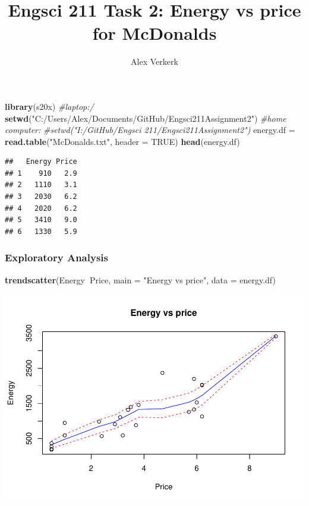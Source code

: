 \documentclass[]{article}
\title{Engsci 211 Task 2: Energy vs price for McDonalds}
\author{Alex Verkerk}
\date{}
\newenvironment{Shaded}{\begin{snugshade}}{\end{snugshade}}
\newcommand{\CommentTok}[1]{\textcolor[rgb]{0.56,0.35,0.01}{\textit{#1}}}
\newcommand{\DataTypeTok}[1]{\textcolor[rgb]{0.13,0.29,0.53}{#1}}
\newcommand{\KeywordTok}[1]{\textcolor[rgb]{0.13,0.29,0.53}{\textbf{#1}}}
\newcommand{\NormalTok}[1]{#1}
\newcommand{\OperatorTok}[1]{\textcolor[rgb]{0.81,0.36,0.00}{\textbf{#1}}}
\newcommand{\OtherTok}[1]{\textcolor[rgb]{0.56,0.35,0.01}{#1}}
\newcommand{\StringTok}[1]{\textcolor[rgb]{0.31,0.60,0.02}{#1}}
\begin{document}
\maketitle

\begin{Shaded}
\begin{Highlighting}[]
\KeywordTok{library}\NormalTok{(s20x)}
\CommentTok{#laptop:/}
\KeywordTok{setwd}\NormalTok{(}\StringTok{"C:/Users/Alex/Documents/GitHub/Engsci211Assignment2"}\NormalTok{)}
\CommentTok{#home computer:}
\CommentTok{#setwd("I:/GitHub/Engsci 211/Engsci211Assignment2")}
\NormalTok{energy.df =}\StringTok{ }\KeywordTok{read.table}\NormalTok{(}\StringTok{"McDonalds.txt"}\NormalTok{, }\DataTypeTok{header =} \OtherTok{TRUE}\NormalTok{)}
\KeywordTok{head}\NormalTok{(energy.df)}
\end{Highlighting}
\end{Shaded}

\begin{verbatim}
##   Energy Price
## 1    910   2.9
## 2   1110   3.1
## 3   2030   6.2
## 4   2020   6.2
## 5   3410   9.0
## 6   1330   5.9
\end{verbatim}

\hypertarget{exploratory-analysis}{%
\subsubsection{Exploratory Analysis}\label{exploratory-analysis}}

\begin{Shaded}
\begin{Highlighting}[]
\KeywordTok{trendscatter}\NormalTok{(Energy}\OperatorTok{~}\NormalTok{Price, }\DataTypeTok{main =} \StringTok{"Energy vs price"}\NormalTok{, }\DataTypeTok{data =}\NormalTok{ energy.df)}
\end{Highlighting}
\end{Shaded}

\includegraphics{Engsci211assignment2_task2_files/figure-latex/unnamed-chunk-2-1.pdf}
\end{document}
